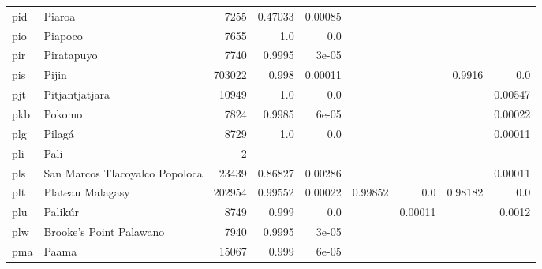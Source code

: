 \documentclass[11pt]{article}
\begin{document}
\begin{table*}[h]
{\begin{tabular}{llrrrrrrr}
pid         & Piaroa         & 7255         & 0.47033         & 0.00085         &          &          &          &          \\

pio         & Piapoco         & 7655         & 1.0         & 0.0         &          &          &          &          \\

pir         & Piratapuyo         & 7740         & 0.9995         & 3e-05         &          &          &          &          \\

pis         & Pijin         & 703022         & 0.998         & 0.00011         &          &          & 0.9916         & 0.0         \\

pjt         & Pitjantjatjara         & 10949         & 1.0         & 0.0         &          &          &          & 0.00547         \\

pkb         & Pokomo         & 7824         & 0.9985         & 6e-05         &          &          &          & 0.00022         \\

plg         & Pilagá         & 8729         & 1.0         & 0.0         &          &          &          & 0.00011         \\

pli         & Pali         & 2         &          &          &          &          &          &          \\

pls         & San Marcos Tlacoyalco Popoloca         & 23439         & 0.86827         & 0.00286         &          &          &          & 0.00011         \\

plt         & Plateau Malagasy         & 202954         & 0.99552         & 0.00022         & 0.99852         & 0.0         & 0.98182         & 0.0         \\

plu         & Palikúr         & 8749         & 0.999         & 0.0         &          & 0.00011         &          & 0.0012         \\

plw         & Brooke's Point Palawano         & 7940         & 0.9995         & 3e-05         &          &          &          &          \\

pma         & Paama         & 15067         & 0.999         & 6e-05         &          &          &          &          \\


\end{tabular}}
\end{table*}
\end{document}
